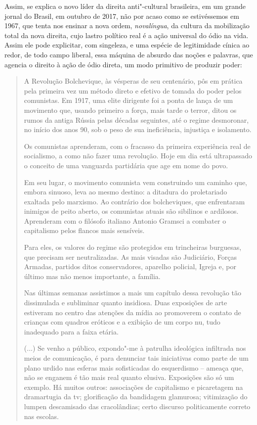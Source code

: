 Assim, se explica o novo líder da direita anti"-cultural brasileira, em
um grande jornal do Brasil, em outubro de 2017, não por acaso como se
estivéssemos em 1967, que tenta nos ensinar a nova ordem,
\emph{novalíngua}, da cultura da mobilização total da nova direita, cujo
lastro político real é a ação universal do ódio na vida. Assim ele pode
explicitar, com singeleza, e uma espécie de legitimidade cínica ao
redor, de todo campo liberal, essa máquina de absurdo das noções e
palavras, que agencia o direito à ação de ódio direta, um modo primitivo
de produzir poder:

\begin{quote}
A Revolução Bolchevique, às vésperas de seu centenário, pôs em prática
pela primeira vez um método direto e efetivo de tomada do poder pelos
comunistas. Em 1917, uma elite dirigente foi a ponta de lança de um
movimento que, usando primeiro a força, mais tarde o terror, ditou os
rumos da antiga Rússia pelas décadas seguintes, até o regime desmoronar,
no início dos anos 90, sob o peso de sua ineficiência, injustiça e
isolamento.

Os comunistas aprenderam, com o fracasso da primeira experiência real de
socialismo, a como não fazer uma revolução. Hoje em dia está
ultrapassado o conceito de uma vanguarda partidária que age em nome do
povo.

Em seu lugar, o movimento comunista vem construindo um caminho que,
embora sinuoso, leva ao mesmo destino: a ditadura do proletariado
exaltada pelo marxismo. Ao contrário dos bolcheviques, que enfrentaram
inimigos de peito aberto, os comunistas atuais são sibilinos e
ardilosos. Aprenderam com o filósofo italiano Antonio Gramsci a combater
o capitalismo pelos flancos mais sensíveis.

Para eles, os valores do regime são protegidos em trincheiras burguesas,
que precisam ser neutralizadas. As mais visadas são Judiciário, Forças
Armadas, partidos ditos conservadores, aparelho policial, Igreja e, por
último mas não menos importante, a família.

Nas últimas semanas assistimos a mais um capítulo dessa revolução tão
dissimulada e subliminar quanto insidiosa. Duas exposições de arte
estiveram no centro das atenções da mídia ao promoverem o contato de
crianças com quadros eróticos e a exibição de um corpo nu, tudo
inadequado para a faixa etária.

(...) Se venho a público, expondo"-me à patrulha ideológica infiltrada
nos meios de comunicação, é para denunciar tais iniciativas como parte
de um plano urdido nas esferas mais sofisticadas do esquerdismo -- ameaça
que, não se enganem é tão mais real quanto elusiva. Exposições são só um
exemplo. Há muitos outros: associações de capitalismo e picaretagem na
dramartugia da tv; glorificação da bandidagem glamurosa; vitimização do
lumpen descamisado das cracolândias; certo discurso politicamente
correto nas escolas.


\end{quote}
